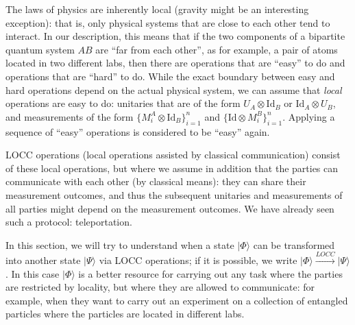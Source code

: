 \documentclass{article}
\theoremstyle{definition}
\newcommand{\id}{\mathrm{Id}}
\newcommand{\ket}[1]{\vert #1 \rangle}
\begin{document}
The laws of physics are inherently local (gravity might be an interesting exception): that is, only physical systems that are close to each other tend to interact. In our description, this means that if the two components of a bipartite quantum system $AB$ are ``far from each other'', as for example, a pair of atoms located in two different labs, then there are operations that are ``easy'' to do and operations that are ``hard'' to do. While the exact boundary between easy and hard operations depend on the actual physical system, we can assume that \emph{local} operations are easy to do: unitaries that are of the form $U_A\otimes \id_B$ or $\id_A\otimes U_B$, and measurements of the form $\{M_i^A\otimes \id_B\}_{i=1}^n$ and $\{\id\otimes M_i^B\}_{i=1}^n$. Applying a sequence of ``easy'' operations is considered to be ``easy'' again. 

LOCC operations (local operations assisted by classical communication) consist of these local operations, but where we assume in addition that the parties can communicate with each other (by classical means): they can share their measurement outcomes, and thus the subsequent unitaries and measurements of all parties might depend on the measurement outcomes. We have already seen such a protocol: teleportation. 

In this section, we will try to understand when a state $\ket{\Phi}$ can be transformed into another state $\ket{\Psi}$ via LOCC operations; if it is possible, we write $\ket{\Phi}\xrightarrow{LOCC}\ket{\Psi}$. In this case $\ket{\Phi}$ is a better resource for carrying out any task where the parties are restricted by locality, but where they are allowed to communicate: for example, when they want to carry out an experiment on a collection of entangled particles where the particles are located in different labs. 



\end{document}
